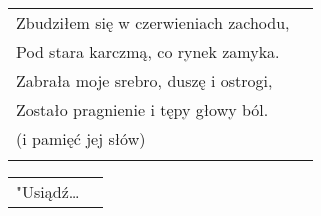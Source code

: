 \documentclass[a5paper]{article}
\begin{document}
\noindent
\begin{tabular}{@{}p{8.00cm}p{3cm}@{}}
Zbudziłem się w czerwieniach zachodu, \\
Pod stara karczmą, co rynek zamyka. \\
Zabrała moje srebro, duszę i ostrogi, \\
Zostało pragnienie i tępy głowy ból. \\
(i pamięć jej słów) \\ \\
\end{tabular}

\noindent
\begin{tabular}{@{}p{8.00cm}p{3cm}@{}}
"Usiądź…
\end{tabular}
\end{document}
